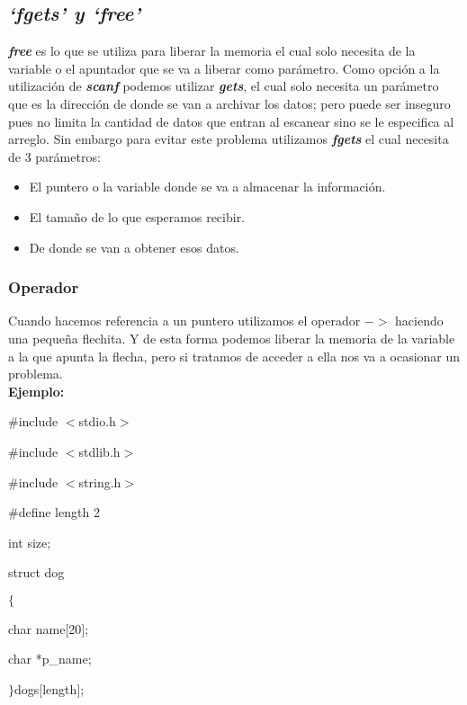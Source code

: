 \documentclass[]{article}
\begin{document}
	\subsection{\textit{`fgets' y `free'}}
	
	\textit{\textbf{free}} es lo que se utiliza para liberar la memoria el cual solo necesita de la variable o el apuntador que se va a liberar como parámetro. Como opción a la utilización de \textit{\textbf{scanf}} podemos utilizar \textit{\textbf{gets}}, el cual solo necesita un parámetro que es la dirección de donde se van a archivar los datos; pero puede ser inseguro pues no limita la cantidad de datos que entran al escanear sino se le especifica al arreglo. Sin embargo para evitar este problema utilizamos \textit{\textbf{fgets}} el cual necesita de 3 parámetros:\\
	
	\begin{itemize}
		\item El puntero o la variable donde se va a almacenar la información.
		\item El tamaño de lo que esperamos recibir.
		\item De donde se van a obtener esos datos.
	\end{itemize}
	
	
	
	\subsubsection{Operador}
	
	Cuando hacemos referencia a un puntero utilizamos el operador $->$ haciendo una pequeña flechita. Y de esta forma podemos liberar la memoria de la variable a la que apunta la flecha, pero si tratamos de acceder a ella nos va a ocasionar un problema.\\
	
	\textbf{Ejemplo:\\}
	
	\#include $<$stdio.h$>$
	
	\#include $<$stdlib.h$>$
	
	\#include $<$string.h$>$
	
	\#define length 2
	
	int size;
	
	struct dog
	
	$\lbrace$
	
	char name$[$20$]$;
	
	char *p\_name;
	
	$\rbrace$dogs$[$length$]$;
	
\end{document}
